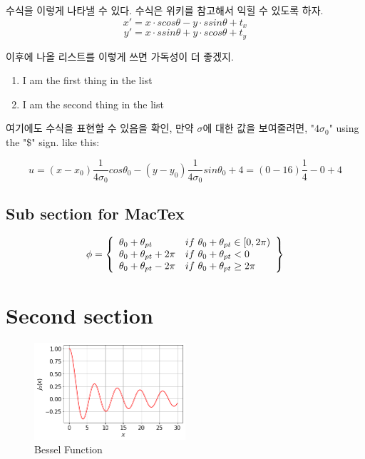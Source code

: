 \documentclass[a4paper,12pt]{article} %
\begin{document}
수식을 이렇게 나타낼 수 있다. 수식은 위키를 참고해서 익힐 수 있도록 하자.
$$x' = x \cdot s cos \theta - y \cdot s sin \theta + t_x$$
$$y' = x \cdot s sin \theta + y \cdot s cos \theta + t_y$$
\vspace{2mm}


\noindent
이후에 나올 리스트를 이렇게 쓰면 가독성이 더 좋겠지.

\vspace{2mm}
\begin{enumerate}
\item I am the first thing in the list
\item I am the second thing in the list
\end{enumerate}
\vspace{2mm}

\noindent
여기에도 수식을 표현할 수 있음을 확인, 만약 $\sigma$에 대한 값을 보여줄려면,  "$4 \sigma_0$" using the "\$" sign. like this: 

\vspace{2mm}
$$u = (x - x_0) \frac{1}{4 \sigma_0} cos \theta_0 - (y - y_0) \frac{1}{4 \sigma_0} sin \theta_0 + 4 = (0 - 16) \frac{1}{4} - 0 + 4$$
\vspace{2mm}


\subsection{Sub section for MacTex}

\vspace{2mm}
\[ \phi = \left\{ 
\begin{array}{l l}
\theta_0 + \theta_{pt} & if \ \theta_0 + \theta_{pt} \in [0,2 \pi)\\ 
\theta_0 + \theta_{pt} + 2 \pi & if \ \theta_0 + \theta_{pt} < 0\\
\theta_0 + \theta_{pt} - 2 \pi & if \ \theta_0 + \theta_{pt} \ge 2 \pi\\
\end{array} \right\}
\] 
\vspace{2mm}


\clearpage

\section{Second section}

\vspace{5mm}
\begin{figure}[!ht]
  \centering
  \includegraphics[width=0.5\textwidth]{12.jpg}
  \caption{Bessel Function}
\end{figure}
\end{document}

